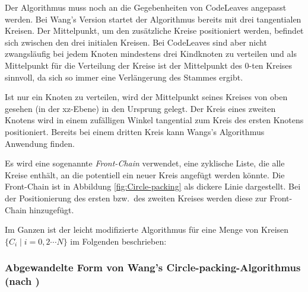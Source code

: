 Der Algorithmus muss noch an die Gegebenheiten von CodeLeaves angepasst werden. Bei Wang's Version startet der Algorithmus bereits mit drei tangentialen Kreisen. Der Mittelpunkt, um den zusätzliche Kreise positioniert werden, befindet sich zwischen den drei initialen Kreisen. Bei CodeLeaves sind aber nicht zwangsläufig bei jedem Knoten mindestens drei Kindknoten zu verteilen und als Mittelpunkt für die Verteilung der Kreise ist der Mittelpunkt des $0$-ten Kreises sinnvoll, da sich so immer eine Verlängerung des Stammes ergibt.

Ist nur ein Knoten zu verteilen, wird der Mittelpunkt seines Kreises von oben gesehen (in der xz-Ebene) in den Ursprung gelegt. Der Kreis eines zweiten Knotens wird in einem zufälligen Winkel tangential zum Kreis des ersten Knotens positioniert. Bereits bei einem dritten Kreis kann Wangs's Algorithmus Anwendung finden.

Es wird eine sogenannte \textit{Front-Chain} verwendet, eine zyklische Liste, die alle Kreise enthält, an die potentiell ein neuer Kreis angefügt werden könnte. Die Front-Chain ist in Abbildung \ref{fig:Circle-packing} als dickere Linie dargestellt. Bei der Positionierung des ersten bzw.\ des zweiten Kreises werden diese zur Front-Chain hinzugefügt.

Im Ganzen ist der leicht modifizierte Algorithmus für eine Menge von Kreisen $\lbrace C_i \mid i = 0, 2 \cdots N \rbrace$ im Folgenden beschrieben:

\subsubsection*{Abgewandelte Form von Wang's Circle-packing-Algorithmus (nach \cite{wang2006visualization})}

